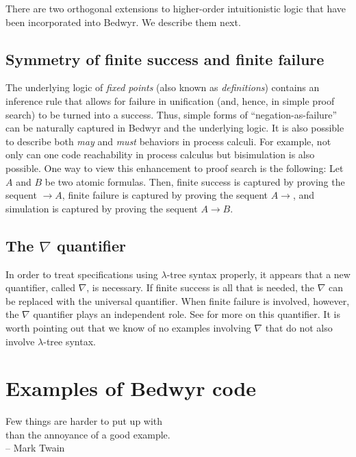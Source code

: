 \bigskip
There are two orthogonal extensions to higher-order intuitionistic
logic that have been incorporated into Bedwyr.   We describe them next.

\subsection{Symmetry of finite success and finite failure}

The underlying logic of {\em fixed points} (also known as {\em
definitions})
\cite{girard92mail,schroeder-Heister93lics,mcdowell03tcs,momigliano03types}
contains an inference rule that allows for failure in unification
(and, hence, in simple proof search) to be turned into a success.
Thus, simple forms of ``negation-as-failure'' can be naturally
captured in Bedwyr and the underlying logic.  It is also possible to
describe both {\em may} and {\em must} behaviors in process calculi.
For example, not only can one code reachability in process calculus
but bisimulation is also possible.  One way to view this enhancement
to proof search is the following: Let $A$ and $B$ be two atomic
formulas.  Then, finite success is captured by proving the sequent
$\longrightarrow A$, finite failure is captured by proving the sequent
$A\longrightarrow$, and simulation is captured by proving the sequent
$A\longrightarrow B$.

\subsection{The \texorpdfstring{$\nabla$}{nabla} quantifier}

In order to treat specifications using $\lambda$-tree syntax
properly, it appears that a new quantifier, called $\nabla$, is
necessary.  If finite success is all that is needed, the $\nabla$ can
be replaced with the universal quantifier.  When finite failure is
involved, however, the $\nabla$ quantifier plays an independent role.
See \cite{miller05tocl,tiu04phd,tiu05concur} for more on this
quantifier.  It is worth pointing out that we know of no examples
involving $\nabla$ that do not also involve $\lambda$-tree syntax.


\section{Examples of Bedwyr code}

\begin{flushright}
Few things are harder to put up with \\
than the annoyance of a good example. \\ -- Mark Twain
\end{flushright}


